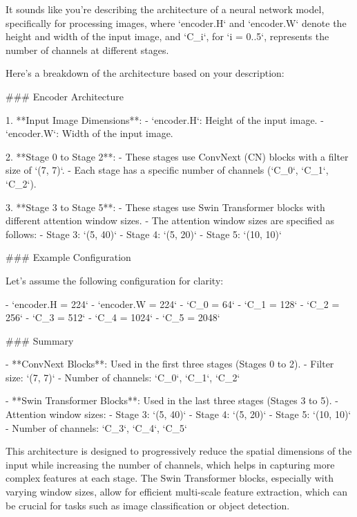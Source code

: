 It sounds like you're describing the architecture of a neural network model, specifically for processing images, where `encoder.H` and `encoder.W` denote the height and width of the input image, and `C_i`, for `i = 0..5`, represents the number of channels at different stages.

Here’s a breakdown of the architecture based on your description:

### Encoder Architecture

1. **Input Image Dimensions**:
   - `encoder.H`: Height of the input image.
   - `encoder.W`: Width of the input image.

2. **Stage 0 to Stage 2**:
   - These stages use ConvNext (CN) blocks with a filter size of `(7, 7)`.
   - Each stage has a specific number of channels (`C_0`, `C_1`, `C_2`).

3. **Stage 3 to Stage 5**:
   - These stages use Swin Transformer blocks with different attention window sizes.
   - The attention window sizes are specified as follows:
     - Stage 3: `(5, 40)`
     - Stage 4: `(5, 20)`
     - Stage 5: `(10, 10)`

### Example Configuration

Let's assume the following configuration for clarity:

- `encoder.H = 224`
- `encoder.W = 224`
- `C_0 = 64`
- `C_1 = 128`
- `C_2 = 256`
- `C_3 = 512`
- `C_4 = 1024`
- `C_5 = 2048`

### Summary

- **ConvNext Blocks**: Used in the first three stages (Stages 0 to 2).
  - Filter size: `(7, 7)`
  - Number of channels: `C_0`, `C_1`, `C_2`

- **Swin Transformer Blocks**: Used in the last three stages (Stages 3 to 5).
  - Attention window sizes:
    - Stage 3: `(5, 40)`
    - Stage 4: `(5, 20)`
    - Stage 5: `(10, 10)`
  - Number of channels: `C_3`, `C_4`, `C_5`

This architecture is designed to progressively reduce the spatial dimensions of the input while increasing the number of channels, which helps in capturing more complex features at each stage. The Swin Transformer blocks, especially with varying window sizes, allow for efficient multi-scale feature extraction, which can be crucial for tasks such as image classification or object detection.